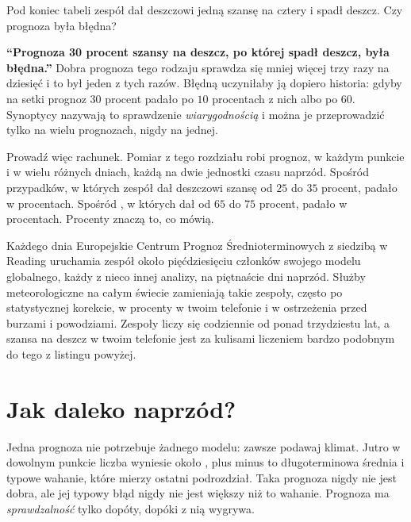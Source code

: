 \begin{think}
Pod koniec tabeli zespół dał deszczowi jedną szansę na cztery i spadł
deszcz. Czy prognoza była błędna?
\end{think}

\begin{trapbox}
\textbf{\enquote{Prognoza 30 procent szansy na deszcz, po której spadł
deszcz, była błędna.}} Dobra prognoza tego rodzaju sprawdza się mniej więcej
trzy razy na dziesięć i to był jeden z tych razów. Błędną uczyniłaby ją
dopiero historia: gdyby na setki prognoz $30$ procent padało po $10$
procentach z nich albo po $60$. Synoptycy nazywają to sprawdzenie
\emph{wiarygodnością} i można je przeprowadzić tylko na wielu prognozach,
nigdy na jednej.
\end{trapbox}

\noindent
Prowadź więc rachunek. Pomiar z tego rozdziału robi 
prognoz, w każdym punkcie i w wielu różnych dniach, każdą na dwie jednostki
czasu naprzód. Spośród  przypadków, w których zespół dał
deszczowi szansę od $25$ do $35$ procent, padało w 
procentach. Spośród , w których dał od $65$ do $75$
procent, padało w  procentach. Procenty znaczą to, co
mówią.

\begin{worldbox}
Każdego dnia Europejskie Centrum Prognoz Średnioterminowych z siedzibą w
Reading uruchamia zespół około pięćdziesięciu członków swojego modelu
globalnego, każdy z nieco innej analizy, na piętnaście dni naprzód. Służby
meteorologiczne na całym świecie zamieniają takie zespoły, często po
statystycznej korekcie, w procenty w twoim telefonie i w ostrzeżenia przed
burzami i powodziami. Zespoły liczy się codziennie od ponad trzydziestu lat,
a szansa na deszcz w twoim telefonie jest za kulisami liczeniem bardzo
podobnym do tego z listingu powyżej.
\end{worldbox}

\section{Jak daleko naprzód?}
\label{sec:ch14-horizon}

\noindent
Jedna prognoza nie potrzebuje żadnego modelu: zawsze podawaj klimat. Jutro w
dowolnym punkcie liczba wyniesie około , plus minus
 \dash{} to długoterminowa średnia i typowe wahanie,
które mierzy ostatni podrozdział. Taka prognoza nigdy nie jest dobra, ale jej
typowy błąd nigdy nie jest większy niż to wahanie. Prognoza ma
\emph{sprawdzalność} tylko dopóty, dopóki z nią wygrywa.

